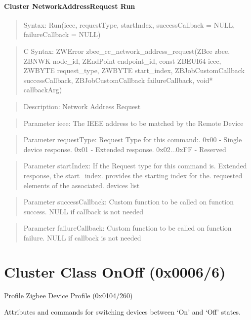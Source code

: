 \paragraph{Cluster NetworkAddressRequest Run}
\begin{quote}Syntax: Run(ieee, requestType, startIndex, successCallback = NULL, failureCallback = NULL)\end{quote}
\begin{quote}C Syntax: ZWError zbee\_cc\_network\_address\_request(ZBee zbee, ZBNWK node\_id, ZEndPoint endpoint\_id, const ZBEUI64 ieee, ZWBYTE request\_type, ZWBYTE start\_index, ZBJobCustomCallback successCallback, ZBJobCustomCallback failureCallback, void* callbackArg)\end{quote}
\begin{quote}Description: Network Address Request\end{quote}
\begin{quote}Parameter ieee: The IEEE address to be matched by the Remote Device\end{quote}
\begin{quote}Parameter requestType: Request Type for this command:. 0x00        - Single device response. 0x01        - Extended response. 0x02...0xFF - Reserved\end{quote}
\begin{quote}Parameter startIndex: If the Request type for this command is. Extended response, the start\_index. provides the starting index for the. requested elements of the associated. devices list\end{quote}
\begin{quote}Parameter successCallback: Custom function to be called on function success. NULL if callback is not needed\end{quote}
\begin{quote}Parameter failureCallback: Custom function to be called on function failure. NULL if callback is not needed\end{quote}



\section{Cluster Class OnOff (0x0006/6)}

Profile Zigbee Device Profile (0x0104/260)

Attributes and commands for switching devices between ‘On’ and ‘Off’ states.
\newline

